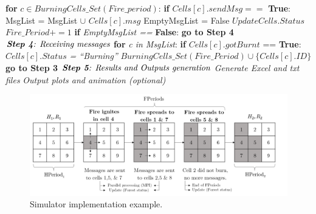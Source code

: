 \documentclass[11pt]{article}
\begin{document}
\begin{algorithm}
\begin{algorithmic}[1]
		\State \hspace{2.0cm} \textbf{for} $c \in BurningCells\_Set(Fire\_period)$:
			\State \hspace{3.0cm} \textbf{if} $Cells[c].sendMsg ==$ \textbf{True}:  
				\State \hspace{4.0cm} MsgList = MsgList $\cup$ $Cells[c].msg$
				\State \hspace{4.0cm} EmptyMsgList = False
		\State \hspace{2.0cm} $Update Cells.Status$
		\State \hspace{2.0cm} $Fire\_Period+=1$
		\State \hspace{2.0cm} \textbf{if} \textit{EmptyMsgList ==} \textbf{False}:
		\State \hspace{3.0cm} \textbf{go to Step 4}
		\State $\textit{\textbf{Step 4}: Receiving messages}$
		\State \hspace{1.0cm} \textbf{for} \textit{c in MsgList}:
			\State \hspace{2.0cm} \textbf{if} $Cells[c].gotBurnt$ == \textbf{True}:
				\State \hspace{3.0cm} $Cells[c].Status$ \textit{= ``Burning''}	
				\State \hspace{3.0cm} $BurningCells\_Set(Fire\_Period) \cup \lbrace Cells[c].ID \rbrace$
			\State \hspace{2.0cm} \textbf{go to Step 3}
	\State $\textit{\textbf{Step 5}: Results and Outputs generation}$
		\State \hspace{1.0cm} \textit{Generate Excel and txt files}
		\State \hspace{1.0cm} \textit{Output plots and animation (optional)}
\EndProcedure
\end{algorithmic}
\end{algorithm}	



\begin{figure}[h!]
\centering
\includegraphics[scale=0.8]{Simulation}
\caption{\label{SImp} Simulator implementation example.} 
\end{figure}
 
\end{document}
